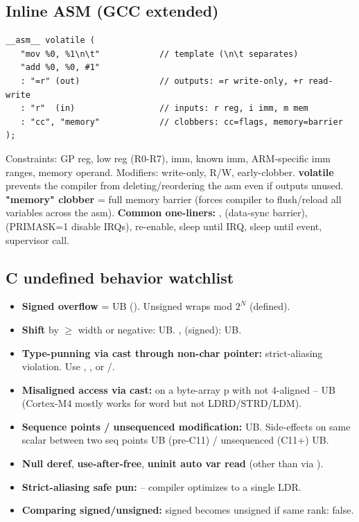 \subsection{Inline ASM (GCC extended)}
\begin{lstlisting}[language={}]
__asm__ volatile (
   "mov %0, %1\n\t"            // template (\n\t separates)
   "add %0, %0, #1"
   : "=r" (out)                // outputs: =r write-only, +r read-write
   : "r"  (in)                 // inputs: r reg, i imm, m mem
   : "cc", "memory"            // clobbers: cc=flags, memory=barrier
);
\end{lstlisting}
Constraints:  GP reg,  low reg (R0-R7),  imm,  known imm,  ARM-specific imm ranges,  memory operand.
Modifiers: \cee{=} write-only, \cee{+} R/W, \cee{\&} early-clobber.
\textbf{volatile} prevents the compiler from deleting/reordering the asm even if outputs unused.
\textbf{"memory" clobber} = full memory barrier (forces compiler to flush/reload all variables across the asm).
\textbf{Common one-liners:}
,  (data-sync barrier),  (PRIMASK=1 disable IRQs),  re-enable,  sleep until IRQ,  sleep until event,  supervisor call.

\subsection{C undefined behavior watchlist}
\begin{itemize}
\item \textbf{Signed overflow} = UB (). Unsigned wraps mod $2^N$ (defined).
\item \textbf{Shift} by ${\geq}$ width or negative: UB. ,  (signed): UB.
\item \textbf{Type-punning via cast through non-char pointer:} strict-aliasing violation. Use , , or /.
\item \textbf{Misaligned access via cast:}  on a byte-array p with  not 4-aligned -- UB (Cortex-M4 mostly works for word but not LDRD/STRD/LDM).
\item \textbf{Sequence points / unsequenced modification:}  UB. Side-effects on same scalar between two seq points UB (pre-C11) / unsequenced (C11+) UB.
\item \textbf{Null deref}, \textbf{use-after-free}, \textbf{uninit auto var read} (other than via ).
\item \textbf{Strict-aliasing safe pun:}  -- compiler optimizes to a single LDR.
\item \textbf{Comparing signed/unsigned:} signed becomes unsigned if same rank:  false.
\end{itemize}

